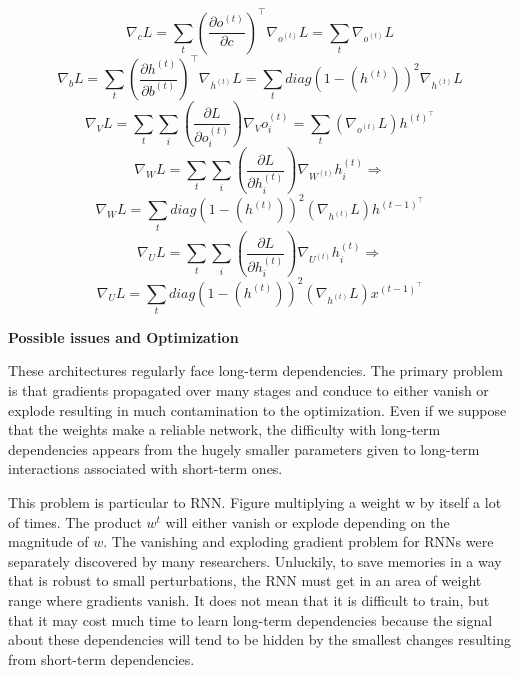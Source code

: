 \begin{equation}
    \nabla_c L = \sum_t (\frac{\partial o^{(t)}}{\partial c})^\top \nabla_{o^{(t)}} L = \sum_t \nabla_{o^{(t)}} L\label{eq:equation15}
\end{equation}
\begin{equation}
    \nabla_b L = \sum_t (\frac{\partial h^{(t)}}{\partial b^{(t)}})^\top \nabla_{h^{(t)}} L = \sum_t diag(1-(h^{(t)}))^2 \nabla_{h^{(t)}} L\label{eq:equation16}
\end{equation}
\begin{equation}
    \nabla_V L = \sum_t \sum_i (\frac{\partial L}{\partial o^{(t)}_i}) \nabla_V o^{(t)}_i = \sum_t (\nabla_{o^{(t)}} L) h^{(t)^\top}\label{eq:equation17}
\end{equation}
\begin{equation}
    \nabla_W L = \sum_t \sum_i (\frac{\partial L}{\partial h^{(t)}_i}) \nabla_{W^{(t)}} h^{(t)}_i \Rightarrow\label{eq:equation18}
\end{equation}
\begin{equation}
    \nabla_W L = \sum_t diag(1-(h^{(t)}))^2 (\nabla_{h^{(t)}} L) h^{(t-1)^\top}\label{eq:equation19}
\end{equation}
\begin{equation}
    \nabla_U L = \sum_t \sum_i (\frac{\partial L}{\partial h^{(t)}_i}) \nabla_{U^{(t)}} h^{(t)}_i \Rightarrow\label{eq:equation20}
\end{equation}
\begin{equation}
    \nabla_U L = \sum_t diag(1-(h^{(t)}))^2 (\nabla_{h^{(t)}} L) x^{(t-1)^\top}\label{eq:equation21}
\end{equation}

{\large \textbf{Possible issues and Optimization}}

These architectures regularly face long-term dependencies.
The primary problem is that gradients propagated over many stages and conduce to either vanish or explode resulting in much contamination to the optimization.
Even if we suppose that the weights make a reliable network,
the difficulty with long-term dependencies appears from the hugely smaller parameters given to long-term interactions associated with short-term ones.

This problem is particular to RNN. Figure multiplying a weight w by itself a lot of times.
The product $w^t$ will either vanish or explode depending on the magnitude of $w$.
The vanishing and exploding gradient problem for RNNs were separately discovered by many researchers.
Unluckily, to save memories in a way that is robust to small perturbations, the RNN must get in an area of weight range where gradients vanish.
It does not mean that it is difficult to train, but that it may cost much time to learn long-term dependencies
because the signal about these dependencies will tend to be hidden by the smallest changes resulting from short-term dependencies.

